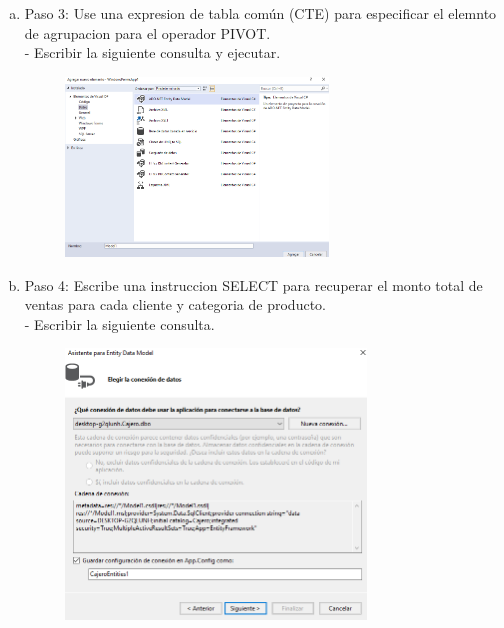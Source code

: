 \begin{enumerate}[1.]
\begin{enumerate}[a)]
\begin{figure}[H]
\begin{center}
		\end{center}
		\end{figure}
	\item Paso 3: Use una expresion de tabla común (CTE) para especificar el elemnto de agrupacion para el operador PIVOT.\\
		-  Escribir la siguiente consulta y ejecutar. 
		\begin{figure}[H]
		\begin{center}
		\includegraphics[width=7cm]{./Imagenes/img6}
		\end{center}
		\end{figure}
	\item Paso 4: Escribe una instruccion SELECT para recuperar el monto total de ventas para cada cliente y categoria de producto.\\
		-  Escribir la siguiente consulta. 
		\begin{figure}[H]
		\begin{center}
		\includegraphics[width=8cm]{./Imagenes/img7}
		\end{center}
		\end{figure}
	\end{enumerate}


\end{enumerate}
